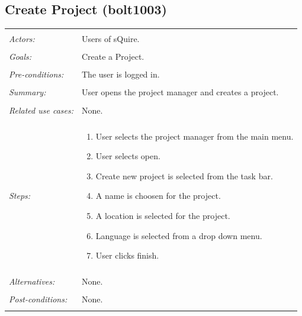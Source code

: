 \documentclass[11pt]{report}
\begin{document}
\subsection{Create Project (bolt1003)}
\begin{tabular}{ p{2cm} p{12cm} }
 \hline
 \\
 \textit{Actors:} & Users of sQuire. \\ 
 \\
 \textit{Goals:} & Create a Project. \\
 \\
 \textit{Pre-conditions:} & The user is logged in. \\
 \\
 \textit{Summary:} & User opens the project manager and creates a project. \\ 
 \\
 \textit{Related use cases:} & None. \\ 
 \\
 \textit{Steps:} & \begin{enumerate}
  \item User selects the project manager from the main menu.
  \item User selects open.
  \item Create new project is selected from the task bar.
  \item A name is choosen for the project.
  \item A location is selected for the project.
  \item Language is selected from a drop down menu.
  \item User clicks finish.
 \end{enumerate} \\
 \\
 \textit{Alternatives:} & None. \\
 \\
 \textit{Post-conditions:} & None. \\
 \\
\hline
\end{tabular}
\end{document}
